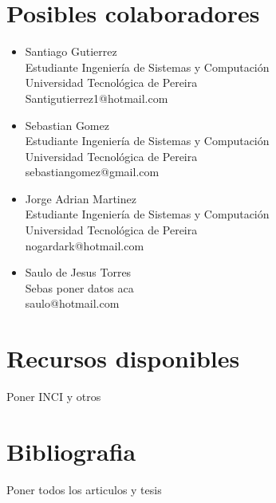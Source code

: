 \documentclass[a4paper, 11pt, oneside]{article}
\begin{document}
	\section{Posibles colaboradores}
	\begin{itemize}
   \item Santiago Gutierrez\\
Estudiante Ingeniería de Sistemas y Computación\\
Universidad Tecnológica de Pereira\\
Santigutierrez1@hotmail.com
   \item Sebastian Gomez\\
Estudiante Ingeniería de Sistemas y Computación\\
Universidad Tecnológica de Pereira\\
sebastiangomez@gmail.com
   \item Jorge Adrian Martinez\\
Estudiante Ingeniería de Sistemas y Computación\\
Universidad Tecnológica de Pereira\\
nogardark@hotmail.com
   \item Saulo de Jesus Torres\\
Sebas poner datos aca\\
saulo@hotmail.com
	\end{itemize}
	\clearpage
	\section{Recursos disponibles}
	Poner INCI y otros
	\clearpage
	\section{Bibliografia}
	Poner todos los articulos y tesis
\end{document}
